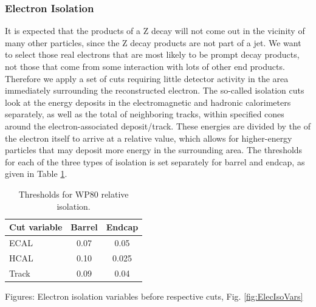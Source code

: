 \subsubsection{Electron Isolation}

It is expected that the products of a Z decay will not come out in the vicinity of many other particles, 
since the Z decay products are not part of a jet.
We want to select those real electrons that are most likely to be prompt decay products,
not those that come from some interaction with lots of other end products.  
Therefore we apply a set of cuts requiring little detector activity in the area immediately surrounding the reconstructed electron.  
The so-called isolation cuts look at the energy deposits in the electromagnetic and hadronic calorimeters separately,
as well as the total \pt of neighboring tracks, within specified \DR cones around the electron-associated deposit/track.  
These energies are divided by the \pt of the electron itself to arrive at a relative value,
which allows for higher-energy particles that may deposit more energy in the surrounding area.  
The thresholds for each of the three types of isolation is set separately for barrel and endcap, 
as given in Table \ref{TableEisoCuts}.  


\begin{table}[htbp]
  \begin{center}
    \caption{Thresholds for WP80 relative isolation.}
    \label{TableEisoCuts}
    \begin{tabular}[]{ | l | c | c | }
      \hline
      Cut variable & Barrel & Endcap  \\ \hline \hline
      ECAL & 0.07 & 0.05  \\ \hline
      HCAL & 0.10 & 0.025  \\ \hline
      Track & 0.09 & 0.04 \\ %
      \hline
    \end{tabular}
  \end{center}
\end{table}

Figures: Electron isolation variables before respective cuts, Fig. \ref{fig:ElecIsoVars}

